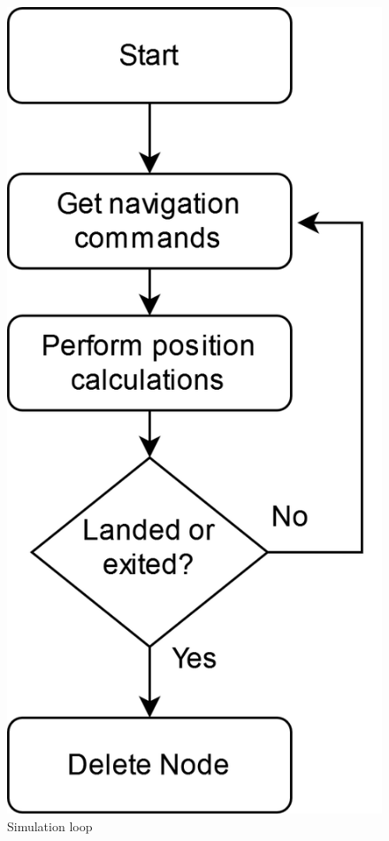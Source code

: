 \documentclass{article}
\begin{document}
\begin{figure}[H]
\centering
\includegraphics{diagrams/flowcharts/aeroplanesimulationprocess.png}
\caption{\label{fig:physics}Simulation loop}
\end{figure}
\end{document}
